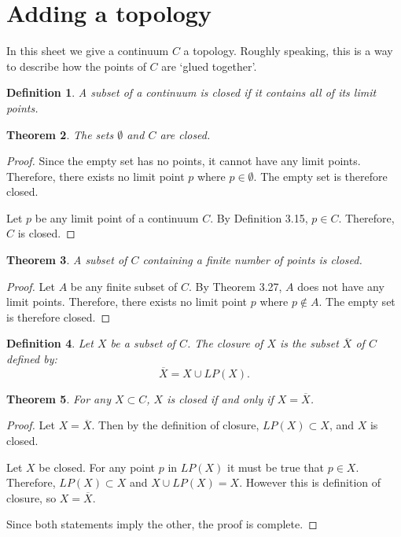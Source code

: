 \documentclass{amsart}
\newtheorem{theorem}{Theorem}
\newtheorem{definition}[theorem]{Definition}
\newcommand{\1}{\mathds{1}}
\numberwithin{equation}{section}
\numberwithin{theorem}{section}
\begin{document}
\bigskip \section{Adding a topology}

In this sheet we give a continuum $C$ a topology.  Roughly speaking, this is a way to describe how the points of $C$ are `glued together'.  

\medskip




\begin{definition}
A subset of a continuum is \emph{closed} if it contains all of its limit points.
\end{definition}

\begin{theorem}  The sets $\emptyset$ and $C$ are closed.
\end{theorem}

\begin{proof}
	Since the empty set has no points, it cannot have any limit points. Therefore, there exists no limit point $p$ where $p\in\emptyset$. The empty set is therefore closed.
	
	Let $p$ be any limit point of a continuum $C$. By Definition 3.15, $p\in C$. Therefore, $C$ is closed.
\end{proof}

\begin{theorem}  A subset of $C$ containing a finite number of points is closed.
\end{theorem}

\begin{proof}
	Let $A$ be any finite subset of $C$. By Theorem 3.27, $A$ does not have any limit points. Therefore, there exists no limit point $p$ where $p\notin A$. The empty set is therefore closed.
\end{proof}

\begin{definition}
Let $X$ be a subset of $C$.  The \emph{closure} of $X$ is the subset $\overline{X}$ of $C$ defined by:
\[
\overline{X} = X \cup LP(X).
\]
\end{definition}

\begin{theorem}  For any $X\subset C$, $X$ is closed if and only if $X = \overline{X}$.
\end{theorem}

\begin{proof}
	Let $X = \overline{X}$. Then by the definition of closure, $LP(X)\subset X$, and $X$ is closed.
	
	Let $X$ be closed. For any point $p$ in $LP(X)$ it must be true that $p\in X$. Therefore, $LP(X)\subset X$ and $X\cup LP(X) = X$. However this is definition of closure, so $X = \overline{X}$.
	
	Since both statements imply the other, the proof is complete.
\end{proof}
\end{document}
